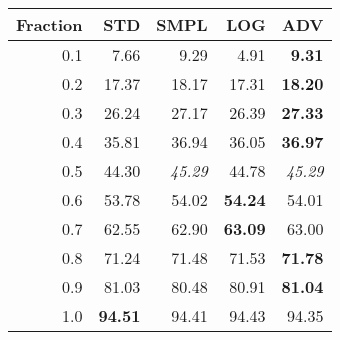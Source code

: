 \documentclass{standalone}
\begin{document}
\begin{tabular}{r|rrrr}
      \toprule
      Fraction & STD & SMPL & LOG & ADV\\
      \midrule
      0.1 & 7.66 & 9.29 & 4.91 & \textbf{9.31}\\
  0.2 & 17.37 & 18.17 & 17.31 & \textbf{18.20}\\
  0.3 & 26.24 & 27.17 & 26.39 & \textbf{27.33}\\
  0.4 & 35.81 & 36.94 & 36.05 & \textbf{36.97}\\
  0.5 & 44.30 & \emph{45.29} & 44.78 & \emph{45.29}\\
  0.6 & 53.78 & 54.02 & \textbf{54.24} & 54.01\\
  0.7 & 62.55 & 62.90 & \textbf{63.09} & 63.00\\
  0.8 & 71.24 & 71.48 & 71.53 & \textbf{71.78}\\
  0.9 & 81.03 & 80.48 & 80.91 & \textbf{81.04}\\
  1.0 & \textbf{94.51} & 94.41 & 94.43 & 94.35\\
  \bottomrule
\end{tabular}
\end{document}

